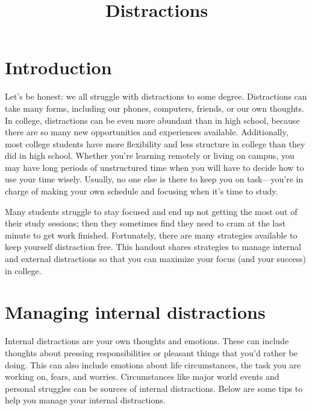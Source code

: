 \documentclass[../main.tex]{subfiles}
\title{Distractions}
\begin{document}
\maketitle
%
\section{Introduction}
Let’s be honest: we all struggle with distractions to some degree. Distractions
can take many forms, including our phones, computers, friends, or our own
thoughts. In college, distractions can be even more abundant than in high
school, because there are so many new opportunities and experiences available.
Additionally, most college students have more flexibility and less structure in
college than they did in high school. Whether you’re learning remotely or living
on campus, you may have long periods of unstructured time when you will have to
decide how to use your time wisely. Usually, no one else is there to keep you on
task—you’re in charge of making your own schedule and focusing when it’s time to
study.

Many students struggle to stay focused and end up not getting the most out of
their study sessions; then they sometimes find they need to cram at the last
minute to get work finished. Fortunately, there are many strategies available to
keep yourself distraction free. This handout shares strategies to manage
internal and external distractions so that you can maximize your focus (and your
success) in college.
%
\section{Managing internal distractions}
Internal distractions are your own thoughts and emotions. These can include
thoughts about pressing responsibilities or pleasant things that you’d rather be
doing. This can also include emotions about life circumstances, the task you are
working on, fears, and worries. Circumstances like major world events and
personal struggles can be sources of internal distractions. Below are some tips
to help you manage your internal distractions.
\\
\end{document}
